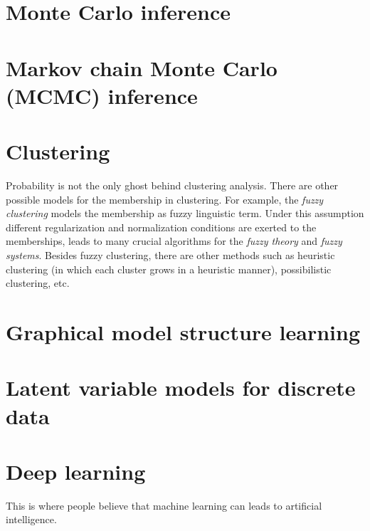 \documentclass[UTF8]{ctexart}
\begin{document}
\newpage
\section{Monte Carlo inference}

\newpage
\section{Markov chain Monte Carlo (MCMC) inference}

\newpage
\section{Clustering}
Probability is not the only ghost behind clustering analysis.
There are other possible models for the membership in clustering. 
For example, the \emph{fuzzy clustering} models the membership as fuzzy linguistic term. 
Under this assumption different regularization and normalization conditions are exerted to the memberships, leads to many crucial algorithms for the \emph{fuzzy theory} and \emph{fuzzy systems}.
Besides fuzzy clustering, there are other methods such as heuristic clustering (in which each cluster grows in a heuristic manner), possibilistic clustering, etc.

\newpage
\section{Graphical model structure learning}

\newpage
\section{Latent variable models for discrete data}


\newpage
\section{Deep learning}
This is where people believe that machine learning can leads to artificial intelligence. 
\end{document}
